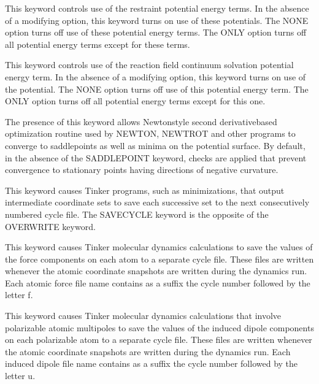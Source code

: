 \documentclass[letterpaper,11pt,english]{sphinxmanual}
\begin{document}
  This keyword controls use of the restraint potential energy terms. In the absence of a modifying option, this keyword turns on use of these potentials. The NONE option turns off use of these potential energy terms. The ONLY option turns off all potential energy terms except for these terms.


  This keyword controls use of the reaction field continuum solvation potential energy term. In the absence of a modifying option, this keyword turns on use of the potential. The NONE option turns off use of this potential energy term. The ONLY option turns off all potential energy terms except for this one.

  The presence of this keyword allows Newton\sphinxhyphen{}style second derivative\sphinxhyphen{}based optimization routine used by NEWTON, NEWTROT and other programs to converge to saddlepoints as well as minima on the potential surface. By default, in the absence of the SADDLEPOINT keyword, checks are applied that prevent convergence to stationary points having directions of negative curvature.

  This keyword causes Tinker programs, such as minimizations, that output intermediate coordinate sets to save each successive set to the next consecutively numbered cycle file. The SAVE\sphinxhyphen{}CYCLE keyword is the opposite of the OVERWRITE keyword.

  This keyword causes Tinker molecular dynamics calculations to save the values of the force components on each atom to a separate cycle file. These files are written whenever the atomic coordinate snapshots are written during the dynamics run. Each atomic force file name contains as a suffix the cycle number followed by the letter f.

  This keyword causes Tinker molecular dynamics calculations that involve polarizable atomic multipoles to save the values of the induced dipole components on each polarizable atom to a separate cycle file. These files are written whenever the atomic coordinate snapshots are written during the dynamics run. Each induced dipole file name contains as a suffix the cycle number followed by the letter u.

\end{document}
